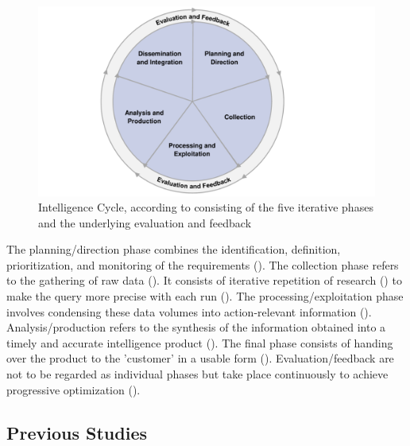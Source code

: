 \documentclass[10pt]{article}
\begin{document}
\begin{figure}[h]
    \centering
    \includegraphics[clip,width=0.6\linewidth]{PDF/images/crop_Intelligence Cycle}
    \caption{Intelligence Cycle, according to \cite{JointChiefsofStaffU.S.Army.2013} consisting of the five iterative phases and the underlying evaluation and feedback}
    \label{fig: Intelligence Cycle}
\end{figure}

The planning/direction phase combines the identification, definition, prioritization, and monitoring
of the requirements (\cite{JointChiefsofStaffU.S.Army.2013}).
The collection phase refers to the gathering of raw data (\cite{CentralIntelligenceAgency.1987}).
It consists of iterative repetition of research
(\cite{NorthAtlanticTreatyOrganization.2001}) to make the query more precise with each run
(\cite{PastorGalindo.2020}). The processing/exploitation phase involves condensing
these data volumes into action-relevant information
(\cite{JointChiefsofStaffU.S.Army.2013}).
Analysis/production refers to the synthesis of the information obtained into a timely and accurate intelligence product
(\cite{Hwang.2022, NorthAtlanticTreatyOrganization.2001}).
The final phase consists of handing over the product to the 'customer' in a
usable form (\cite{CentralIntelligenceAgency.2023, Williams.2018}).
Evaluation/feedback are not to be regarded as individual phases
but take place continuously to achieve progressive optimization
(\cite{JointChiefsofStaffU.S.Army.2013, NorthAtlanticTreatyOrganization.2001}).

\subsection{Previous Studies}
\end{document}

